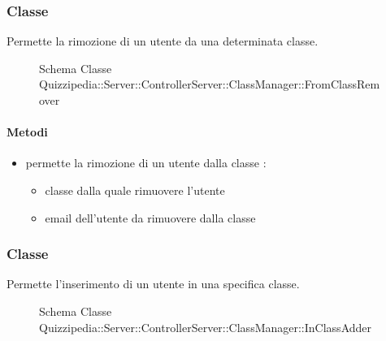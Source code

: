 \subsubsection{Classe }
Permette la rimozione di un utente da una determinata classe.
\begin{figure}[H]
\centering
\noindent{}
\caption[Schema Classe FromClassRemover]{Schema Classe Quizzipedia::Server::ControllerServer::ClassManager::FromClassRemover}
\end{figure}
\paragraph{Metodi}
\begin{itemize}
\item {}
\newline
permette la rimozione di un utente dalla classe
\newline
{} :
\begin{itemize}
\item {}
\newline
classe dalla quale rimuovere l'utente
\item {}
\newline
email dell'utente da rimuovere dalla classe
\end{itemize}
\end{itemize}
\subsubsection{Classe }
Permette l'inserimento di un utente in una specifica classe.
\begin{figure}[H]
\centering
\noindent{}
\caption[Schema Classe InClassAdder]{Schema Classe Quizzipedia::Server::ControllerServer::ClassManager::InClassAdder}
\end{figure}
